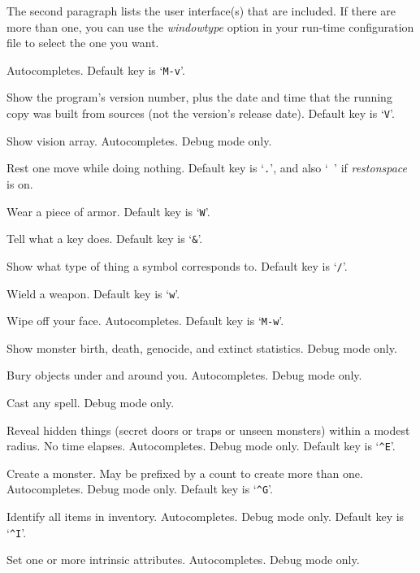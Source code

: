 \documentclass[titlepage]{article}
\begin{document}
\begin{description}[font=\mdseries\ttfamily]
The second paragraph lists the user interface(s) that are included.
If there are more than one, you can use the \textit{windowtype}
option in your run-time configuration file to select the one you want.

Autocompletes. Default key is `\texttt{M-v}'.
\item[\#versionshort]
Show the program's version number, plus the date and time that the
running copy was built from sources (not the version's release date).
Default key is `\texttt{V}'.
\item[\#vision]
Show vision array.
Autocompletes.
Debug mode only.
\item[\#wait]
Rest one move while doing nothing.
Default key is `\texttt{.}', and also `{\tt{ }}' if
\textit{rest\textunderscore on\textunderscore space} is on.
\item[\#wear]
Wear a piece of armor. Default key is `\texttt{W}'.
\item[\#whatdoes]
Tell what a key does. Default key is `\texttt{\&}'.
\item[\#whatis]
Show what type of thing a symbol corresponds to. Default key is `\texttt{/}'.
\item[\#wield]
Wield a weapon. Default key is `\texttt{w}'.
\item[\#wipe]
Wipe off your face. Autocompletes. Default key is `\texttt{M-w}'.
\item[\#wizborn]
Show monster birth, death, genocide, and extinct statistics.
Debug mode only.
\item[\#wizbury]
Bury objects under and around you.
Autocompletes.
Debug mode only.
\item[\#wizcast]
Cast any spell.
Debug mode only.
\item[\#wizdetect]
Reveal hidden things (secret doors or traps or unseen monsters)
within a modest radius.
No time elapses.
Autocompletes.
Debug mode only.
Default key is `\texttt{\textasciicircum E}'.
\item[\#wizgenesis]
Create a monster.
May be prefixed by a count to create more than one.
Autocompletes.
Debug mode only.
Default key is `\texttt{\textasciicircum G}'.
\item[\#wizidentify]
Identify all items in inventory.
Autocompletes.
Debug mode only.
Default key is `\texttt{\textasciicircum I}'.
\item[\#wizintrinsic]
Set one or more intrinsic attributes.
Autocompletes.
Debug mode only.
\item[\#wizkill]

\end{description}
\end{document}
